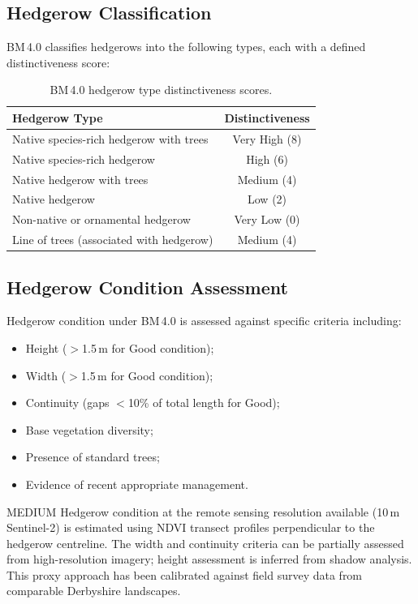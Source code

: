 \subsection{Hedgerow Classification}

BM\,4.0 classifies hedgerows into the following types, each with a defined distinctiveness score:

\begin{table}[H]
\centering
\caption{BM\,4.0 hedgerow type distinctiveness scores.}
\label{tab:hedge-distinctiveness}
\begin{tabular}{lc}
\toprule
\textbf{Hedgerow Type} & \textbf{Distinctiveness} \\
\midrule
Native species-rich hedgerow with trees              & Very High (8) \\
Native species-rich hedgerow                         & High (6) \\
Native hedgerow with trees                           & Medium (4) \\
Native hedgerow                                      & Low (2) \\
Non-native or ornamental hedgerow                    & Very Low (0) \\
Line of trees (associated with hedgerow)             & Medium (4) \\
\bottomrule
\end{tabular}
\end{table}

\subsection{Hedgerow Condition Assessment}

Hedgerow condition under BM\,4.0 is assessed against specific criteria including:
\begin{itemize}[nosep]
  \item Height ($>$1.5\,m for Good condition);
  \item Width ($>$1.5\,m for Good condition);
  \item Continuity (gaps $<$10\% of total length for Good);
  \item Base vegetation diversity;
  \item Presence of standard trees;
  \item Evidence of recent appropriate management.
\end{itemize}

\begin{confidencebox}{MEDIUM}
Hedgerow condition at the remote sensing resolution available (10\,m Sentinel-2) is estimated using NDVI transect profiles perpendicular to the hedgerow centreline. The width and continuity criteria can be partially assessed from high-resolution imagery; height assessment is inferred from shadow analysis. This proxy approach has been calibrated against field survey data from comparable Derbyshire landscapes.
\end{confidencebox}

